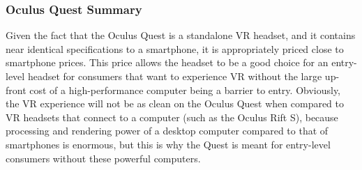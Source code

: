 \subsubsection{Oculus Quest Summary}
Given the fact that the Oculus Quest is a standalone VR headset, and it contains
near identical specifications to a smartphone, it is appropriately priced close to
smartphone prices. This price allows the headset to be a good choice for an 
entry-level headset for consumers that want to experience VR without the 
large up-front cost of a high-performance computer being a barrier to entry.
Obviously, the VR experience will not be as clean on the Oculus Quest when compared
to VR headsets that connect to a computer (such as the Oculus Rift S), because processing
and rendering power of a desktop computer compared to that of smartphones is enormous,
but this is why the Quest is meant for entry-level consumers without these powerful
computers.